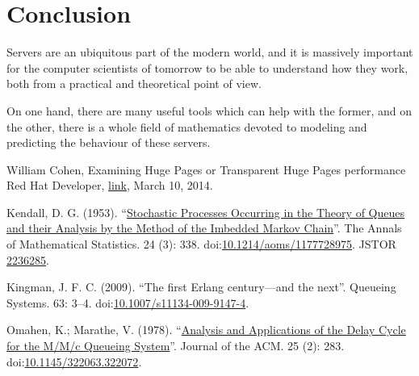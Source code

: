 \documentclass[journal]{IEEEtran}
\theoremstyle{definition}
\begin{document}
\section*{Conclusion}
Servers are an ubiquitous part of the modern world, and it is massively important for the computer scientists of tomorrow to be able to understand how they work, both from a practical and theoretical point of view.

On one hand, there are many useful tools which can help with the former, and on the other, there is a whole field of mathematics devoted to modeling and predicting the behaviour of these servers.

\begin{thebibliography}{9}
	William Cohen, Examining Huge Pages or Transparent Huge Pages performance Red Hat Developer, \href{https://developers.redhat.com/blog/2014/03/10/examining-huge-pages-or-transparent-huge-pages-performance/}{link}, March 10, 2014.
	
	Kendall, D. G. (1953). ``\href{http://projecteuclid.org/euclid.aoms/1177728975}{Stochastic Processes Occurring in the Theory of Queues and their Analysis by the Method of the Imbedded Markov Chain}''. The Annals of Mathematical Statistics. 24 (3): 338. doi:\href{https://projecteuclid.org/euclid.aoms/1177728975}{10.1214/aoms/1177728975}{}. JSTOR \href{https://www.jstor.org/stable/2236285}{2236285}.
	
	Kingman, J. F. C. (2009). ``The first Erlang century—and the next''. Queueing Systems. 63: 3–4. doi:\href{https://link.springer.com/article/10.1007\%2Fs11134-009-9147-4}{10.1007/s11134-009-9147-4}.
	
	Omahen, K.; Marathe, V. (1978). ``\href{https://docs.lib.purdue.edu/cgi/viewcontent.cgi?article=1110\&context=cstech}{Analysis and Applications of the Delay Cycle for the M/M/c Queueing System}''. Journal of the ACM. 25 (2): 283. doi:\href{https://dl.acm.org/doi/10.1145/322063.322072}{10.1145/322063.322072}.
\end{thebibliography}
 
\end{document}
